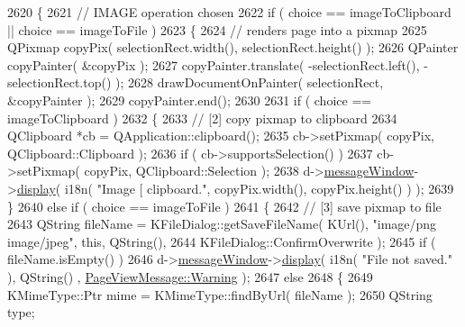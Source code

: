 \begin{DoxyCode}
{{2620             \{
2621             \textcolor{comment}{// IMAGE operation chosen}
2622             \textcolor{keywordflow}{if} ( choice == imageToClipboard || choice == imageToFile )
2623             \{
2624                 \textcolor{comment}{// renders page into a pixmap}
2625                 QPixmap copyPix( selectionRect.width(), selectionRect.height() );
2626                 QPainter copyPainter( &copyPix );
2627                 copyPainter.translate( -selectionRect.left(), -selectionRect.top() );
2628                 drawDocumentOnPainter( selectionRect, &copyPainter );
2629                 copyPainter.end();
2630 
2631                 \textcolor{keywordflow}{if} ( choice == imageToClipboard )
2632                 \{
2633                     \textcolor{comment}{// [2] copy pixmap to clipboard}
2634                     QClipboard *cb = QApplication::clipboard();
2635                     cb->setPixmap( copyPix, QClipboard::Clipboard );
2636                     \textcolor{keywordflow}{if} ( cb->supportsSelection() )
2637                         cb->setPixmap( copyPix, QClipboard::Selection );
2638                     d->\hyperlink{classPageViewPrivate_aa836af37149ea9fbfefd8de357c9194b}{messageWindow}->\hyperlink{classPageViewMessage_a7fd107b1b7a6c0ae64a4d09fc2467982}{display}( i18n( \textcolor{stringliteral}{"Image [%
       clipboard."}, copyPix.width(), copyPix.height() ) );
2639                 \}
2640                 \textcolor{keywordflow}{else} \textcolor{keywordflow}{if} ( choice == imageToFile )
2641                 \{
2642                     \textcolor{comment}{// [3] save pixmap to file}
2643                     QString fileName = KFileDialog::getSaveFileName( KUrl(), \textcolor{stringliteral}{"image/png image/jpeg"}, \textcolor{keyword}{this}, 
      QString(),
2644                                                                      KFileDialog::ConfirmOverwrite );
2645                     \textcolor{keywordflow}{if} ( fileName.isEmpty() )
2646                         d->\hyperlink{classPageViewPrivate_aa836af37149ea9fbfefd8de357c9194b}{messageWindow}->\hyperlink{classPageViewMessage_a7fd107b1b7a6c0ae64a4d09fc2467982}{display}( i18n( \textcolor{stringliteral}{"File not saved."} ), QString()
      , \hyperlink{classPageViewMessage_aeb83801b92379715663d5a7beaa2ae0ca8d795d55732497f572dde8b9491ce280}{PageViewMessage::Warning} );
2647                     \textcolor{keywordflow}{else}
2648                     \{
2649                         KMimeType::Ptr mime = KMimeType::findByUrl( fileName );
2650                         QString type;
}}
\end{DoxyCode}
